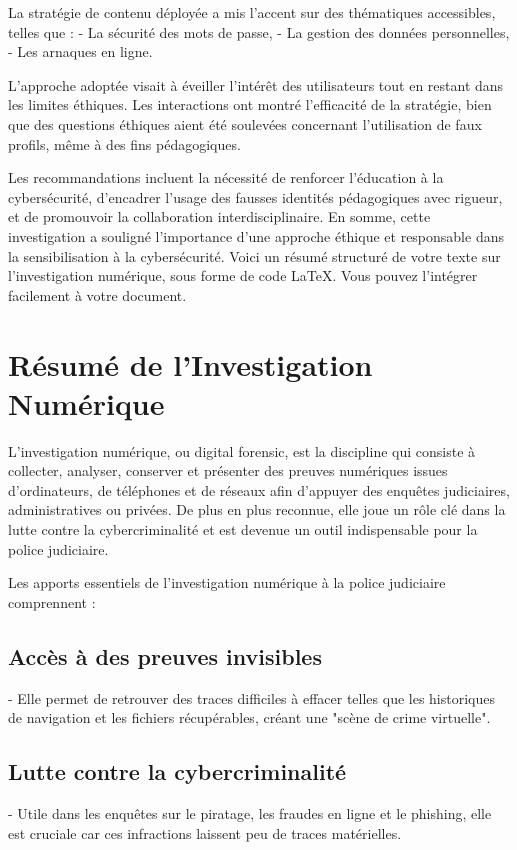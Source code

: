 \documentclass[12pt,a4paper]{article}
\begin{document}
La stratégie de contenu déployée a mis l’accent sur des thématiques accessibles, telles que :
- La sécurité des mots de passe,
- La gestion des données personnelles,
- Les arnaques en ligne.

L'approche adoptée visait à éveiller l'intérêt des utilisateurs tout en restant dans les limites éthiques. Les interactions ont montré l’efficacité de la stratégie, bien que des questions éthiques aient été soulevées concernant l’utilisation de faux profils, même à des fins pédagogiques.

Les recommandations incluent la nécessité de renforcer l'éducation à la cybersécurité, d'encadrer l'usage des fausses identités pédagogiques avec rigueur, et de promouvoir la collaboration interdisciplinaire. En somme, cette investigation a souligné l'importance d'une approche éthique et responsable dans la sensibilisation à la cybersécurité.
Voici un résumé structuré de votre texte sur l’investigation numérique, sous forme de code LaTeX. Vous pouvez l’intégrer facilement à votre document.

\section{Résumé de l'Investigation Numérique}

L’investigation numérique, ou digital forensic, est la discipline qui consiste à collecter, analyser, conserver et présenter des preuves numériques issues d’ordinateurs, de téléphones et de réseaux afin d'appuyer des enquêtes judiciaires, administratives ou privées. De plus en plus reconnue, elle joue un rôle clé dans la lutte contre la cybercriminalité et est devenue un outil indispensable pour la police judiciaire.

Les apports essentiels de l'investigation numérique à la police judiciaire comprennent :

\subsection{Accès à des preuves invisibles}
- Elle permet de retrouver des traces difficiles à effacer telles que les historiques de navigation et les fichiers récupérables, créant une "scène de crime virtuelle".

\subsection{Lutte contre la cybercriminalité}
- Utile dans les enquêtes sur le piratage, les fraudes en ligne et le phishing, elle est cruciale car ces infractions laissent peu de traces matérielles.
\end{document}

